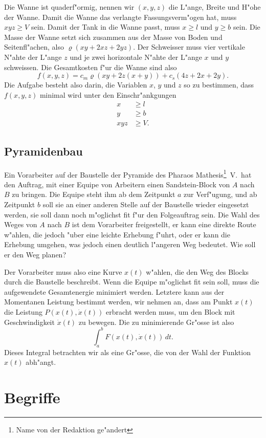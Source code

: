 Die Wanne ist quaderf"ormig, nennen wir $(x,y,z)$ die L"ange, Breite
und H"ohe der Wanne. Damit die Wanne das verlangte
Fassungsverm"ogen hat, muss $xyz\ge V$ sein.
Damit der Tank in die Wanne passt, muss $x\ge l$ und $y\ge b$ sein.
Die Masse der Wanne setzt sich zusammen aus der Masse von Boden
und Seitenfl"achen, also
$\varrho(xy+2xz+2yz)$. Der Schweisser muss vier vertikale N"ahte
der L"ange $z$ und je zwei horizontale N"ahte der L"ange $x$ und $y$
schweissen. Die Gesamtkosten f"ur die Wanne sind also
\[
f(x,y,z)=c_m\varrho(xy+2z(x+y))+c_s(4z+2x+2y).
\]
Die Aufgabe besteht also darin, die Variablen $x$, $y$ und $z$ so
zu bestimmen, dass $f(x,y,z)$ minimal wird unter den Einschr"ankgungen
\begin{align*}
x&\ge l\\
y&\ge b\\
xyz&\ge V.
\end{align*}

\subsection{Pyramidenbau\label{uebersicht:pyramidenbau}}
Ein Vorarbeiter auf der Baustelle der Pyramide des Pharaos
Mathesis\footnote{Name von der Redaktion ge"andert}~V.~hat den Auftrag, mit
einer Equipe von Arbeitern einen Sandstein-Block von $A$ nach $B$
zu bringen. Die Equipe steht ihm ab dem Zeitpunkt $a$ zur Verf"ugung,
und ab Zeitpunkt $b$ soll sie an einer anderen Stelle auf der Baustelle
wieder eingesetzt werden, sie soll dann noch m"oglichst fit f"ur
den Folgeauftrag sein. Die Wahl des Weges von $A$ nach $B$ ist
dem Vorarbeiter freigestellt, er kann eine direkte Route w"ahlen, die
jedoch "uber eine leichte Erhebung f"uhrt, oder er kann die Erhebung
umgehen, was jedoch einen deutlich l"angeren Weg bedeutet. Wie soll
er den Weg planen?

Der Vorarbeiter muss also eine
Kurve $x(t)$ w"ahlen, die den Weg des Blocks durch die Baustelle
beschreibt.
Wenn die Equipe m"oglichst fit sein soll, muss die aufgewendete
Gesamtenergie minimiert werden. 
Letztere kann aus der Momentanen Leistung bestimmt werden, wir 
nehmen an, dass am Punkt $x(t)$ die Leistung $P(x(t), \dot x(t))$
erbracht werden muss, um den Block mit Geschwindigkeit $\dot x(t)$
zu bewegen. Die zu minimierende Gr"osse ist also
\[
\int_a^bF(x(t), \dot x(t))\,dt.
\]
Dieses Integral betrachten wir als eine Gr"osse, die von der Wahl
der Funktion $x(t)$ abh"angt.

\section{Begriffe\label{section-begriffe}}
